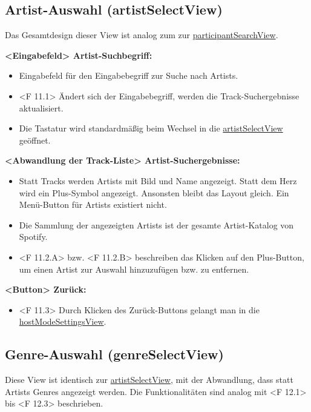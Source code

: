 \documentclass[oneside, ngerman]{sdqtechreport}
\begin{document}
\subsection{Artist-Auswahl (artistSelectView)}
\label{sec:Benutzeroberfläche:artistSelectView}
\hypertarget{artistSelectView}{}

Das Gesamtdesign dieser View ist analog zum zur \hyperlink{participantSearchView}{participantSearchView}.

\textbf{<Eingabefeld> Artist-Suchbegriff:}
\begin{itemize}
    \item Eingabefeld für den Eingabebegriff zur Suche nach Artists.
    \item <F 11.1> Ändert sich der Eingabebegriff, werden die Track-Suchergebnisse aktualisiert.
    \item Die Tastatur wird standardmäßig beim Wechsel in die \hyperlink{artistSelectView}{artistSelectView} geöffnet.
\end{itemize}

\textbf{<Abwandlung der Track-Liste> Artist-Suchergebnisse:}
\begin{itemize}
    \item Statt Tracks werden Artists mit Bild und Name angezeigt. Statt dem Herz wird ein Plus-Symbol angezeigt. Ansonsten bleibt das Layout gleich. Ein Menü-Button für Artists existiert nicht.
    \item Die Sammlung der angezeigten Artists ist der gesamte Artist-Katalog von Spotify.
    \hypertarget{<F 11.2.A>}{}
    \hypertarget{<F 11.2.B> }{}
    \item <F 11.2.A> bzw. <F 11.2.B> beschreiben das Klicken auf den Plus-Button, um einen Artist zur Auswahl hinzuzufügen bzw. zu entfernen.
\end{itemize}

\textbf{<Button> Zurück:}
\begin{itemize}
    \hypertarget{<F 11.3>}{}
    \item <F 11.3> Durch Klicken des Zurück-Buttons gelangt man in die  \hyperlink{hostModeSettingsView}{hostModeSettingsView}.
\end{itemize}


\subsection{Genre-Auswahl (genreSelectView)}
\label{sec:Benutzeroberfläche:genreSelectView}
\hypertarget{genreSelectView}{}

Diese View ist identisch zur \hyperlink{artistSelectView}{artistSelectView}, mit der Abwandlung, dass statt Artists Genres angezeigt werden. Die Funktionalitäten sind analog mit <F 12.1> bis <F 12.3> beschrieben.
\end{document}
